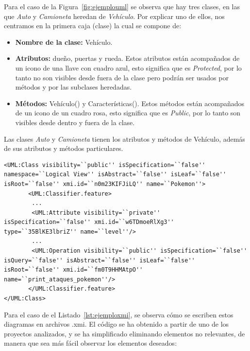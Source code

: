 \documentclass[a4paper, 12pt]{book}
\begin{document}
Para el caso de la Figura~\ref{fig:ejemplouml} se observa que hay tres clases, en las que \textit{Auto} y \textit{Camioneta} heredan de \textit{Vehículo}. Por explicar uno de ellos, nos centramos en la primera caja (clase) la cual se compone de:

\begin{itemize}
  \item \textbf{Nombre de la clase:} Vehículo.
  \item \textbf{Atributos:} dueño, puertas y rueda. Estos atributos están acompañados de un icono de una llave con cuadro azul, esto significa que es \textit{Protected}, por lo tanto no son visibles desde fuera de la clase pero podrán ser usados por métodos y por las subclases heredadas.
  \item \textbf{Métodos:} Vehículo() y Características(). Estos métodos están acompañados de un icono de un cuadro rosa, esto significa que es \textit{Public}, por lo tanto son visibles desde dentro y fuera de la clase.
\end{itemize}

Las clases \textit{Auto} y \textit{Camioneta} tienen los atributos y métodos de Vehículo, además de sus atributos y métodos particulares.

\begin{lstlisting}[caption={Ejemplo de una clase en un archivo xmi},label={lst:ejemploxmi},breaklines=true, basicstyle=\small]
<UML:Class visibility=``public'' isSpecification=``false'' namespace=``Logical View'' isAbstract=``false'' isLeaf=``false'' isRoot=``false'' xmi.id=``n0m23KIFJiLQ'' name=``Pokemon''>
       <UML:Classifier.feature>
        ...
        <UML:Attribute visibility=``private'' isSpecification=``false'' xmi.id=``w6TDmoeRlXg3'' type=``35BlKE3lbriZ'' name=``level''/>
        ...
        <UML:Operation visibility=``public'' isSpecification=``false'' isQuery=``false'' isAbstract=``false'' isLeaf=``false'' isRoot=``false'' xmi.id=``fm0T9HHMAtpO'' name=``print_ataques_pokemon''/>
       </UML:Classifier.feature>
</UML:Class>
\end{lstlisting}

Para el caso de el Listado~\ref{lst:ejemploxmi}, se observa cómo se escriben estos diagramas en archivos .xmi. El código se ha obtenido a partir de uno de los proyectos analizados, y se ha simplificado eliminando elementos no relevantes, de manera que sea más fácil observar los elementos deseados:
\end{document}
